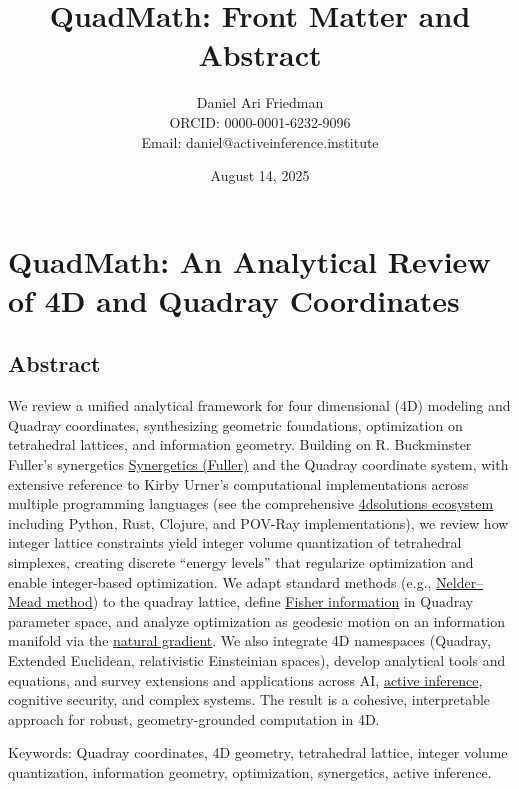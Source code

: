 \documentclass[
]{article}
\title{QuadMath: Front Matter and Abstract}
\author{Daniel Ari Friedman\\ ORCID: 0000-0001-6232-9096\\ Email: daniel@activeinference.institute}
\date{August 14, 2025}
\begin{document}
\maketitle

\hypertarget{quadmath-an-analytical-review-of-4d-and-quadray-coordinates}{%
\section{QuadMath: An Analytical Review of 4D and Quadray
Coordinates}\label{quadmath-an-analytical-review-of-4d-and-quadray-coordinates}}

\hypertarget{abstract}{%
\subsection{Abstract}\label{abstract}}

We review a unified analytical framework for four dimensional (4D)
modeling and Quadray coordinates, synthesizing geometric foundations,
optimization on tetrahedral lattices, and information geometry. Building
on R. Buckminster Fuller's synergetics
\href{https://en.wikipedia.org/wiki/Synergetics_(Fuller)}{Synergetics
(Fuller)} and the Quadray coordinate system, with extensive reference to
Kirby Urner's computational implementations across multiple programming
languages (see the comprehensive
\href{https://github.com/4dsolutions}{4dsolutions ecosystem} including
Python, Rust, Clojure, and POV-Ray implementations), we review how
integer lattice constraints yield integer volume quantization of
tetrahedral simplexes, creating discrete ``energy levels'' that
regularize optimization and enable integer-based optimization. We adapt
standard methods (e.g.,
\href{https://en.wikipedia.org/wiki/Nelder\%E2\%80\%93Mead_method}{Nelder--Mead
method}) to the quadray lattice, define
\href{https://en.wikipedia.org/wiki/Fisher_information}{Fisher
information} in Quadray parameter space, and analyze optimization as
geodesic motion on an information manifold via the
\href{https://en.wikipedia.org/wiki/Natural_gradient}{natural gradient}.
We also integrate 4D namespaces (Quadray, Extended Euclidean,
relativistic Einsteinian spaces), develop analytical tools and
equations, and survey extensions and applications across AI,
\href{https://welcome.activeinference.institute/}{active inference},
cognitive security, and complex systems. The result is a cohesive,
interpretable approach for robust, geometry-grounded computation in 4D.

Keywords: Quadray coordinates, 4D geometry, tetrahedral lattice, integer
volume quantization, information geometry, optimization, synergetics,
active inference.
\end{document}
